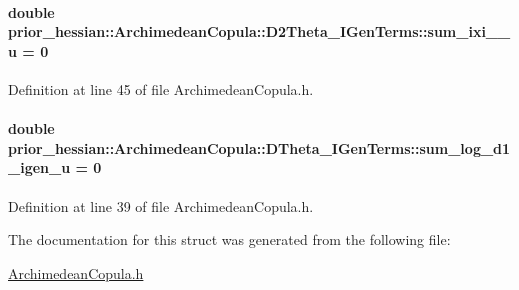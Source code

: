 \paragraph[{\texorpdfstring{sum\+\_\+ixi\+\_\+01\+\_\+u}{sum_ixi_01_u}}]{\setlength{\rightskip}{0pt plus 5cm}double prior\+\_\+hessian\+::\+Archimedean\+Copula\+::\+D2\+Theta\+\_\+\+I\+Gen\+Terms\+::sum\+\_\+ixi\+\_\+\_\+u = 0}\hypertarget{structprior__hessian_1_1ArchimedeanCopula_1_1D2Theta__IGenTerms_ac21f6a61609d5b1b1e577a660115f8a9}{}\label{structprior__hessian_1_1ArchimedeanCopula_1_1D2Theta__IGenTerms_ac21f6a61609d5b1b1e577a660115f8a9}


Definition at line 45 of file Archimedean\+Copula.\+h.

\paragraph[{\texorpdfstring{sum\+\_\+log\+\_\+d1\+\_\+igen\+\_\+u}{sum_log_d1_igen_u}}]{\setlength{\rightskip}{0pt plus 5cm}double prior\+\_\+hessian\+::\+Archimedean\+Copula\+::\+D\+Theta\+\_\+\+I\+Gen\+Terms\+::sum\+\_\+log\+\_\+d1\+\_\+igen\+\_\+u = 0\hspace{0.3cm}{\ttfamily [inherited]}}\hypertarget{structprior__hessian_1_1ArchimedeanCopula_1_1DTheta__IGenTerms_aa92089ec503423453715423320611ac6}{}\label{structprior__hessian_1_1ArchimedeanCopula_1_1DTheta__IGenTerms_aa92089ec503423453715423320611ac6}


Definition at line 39 of file Archimedean\+Copula.\+h.



The documentation for this struct was generated from the following file\+:\begin{DoxyCompactItemize}
\item 
\hyperlink{ArchimedeanCopula_8h}{Archimedean\+Copula.\+h}\end{DoxyCompactItemize}
